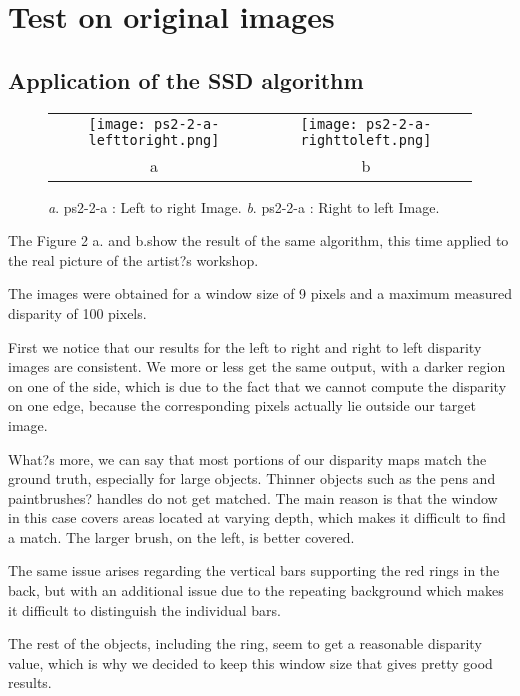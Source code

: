 \documentclass[a4paper,11pt]{article}
\begin{document}
\section{Test on original images}

\subsection{Application of the SSD algorithm}



 \begin{figure}[H]
\begin{center}
\begin{tabular}{cc}
	\texttt{[image: ps2-2-a-lefttoright.png]}&
	\texttt{[image: ps2-2-a-righttoleft.png]}\\
	a&b
\end{tabular}
\end{center}
\caption{ 
\textit{a}. ps2-2-a : Left to right Image.  \textit{b}. ps2-2-a : Right to left Image. }
\label{ps2-1}
\end{figure}

The Figure 2 a. and b.show the result of the same algorithm, this time applied to the real picture of the artist?s workshop.

The images were obtained for a window size of 9 pixels and a maximum measured disparity of 100 pixels.

First we notice that our results for the left to right and right to left disparity images are consistent. We more or less get the same output, with a darker region on one of the side, which is due to the fact that we cannot compute the disparity on one edge, because the corresponding pixels actually lie outside our target image.

What?s more, we can say that most portions of our disparity maps match the ground truth, especially for large objects. Thinner objects such as the pens and paintbrushes? handles do not get matched. The main reason is that the window in this case covers areas located at varying depth, which makes it difficult to find a match. The larger brush, on the left, is better covered.

The same issue arises regarding the vertical bars supporting the red rings in the back, but with an additional issue due to the repeating background which makes it difficult to distinguish the individual bars.

The rest of the objects, including the ring, seem to get a reasonable disparity value, which is why we decided to keep this window size that gives pretty good results.
\end{document}
